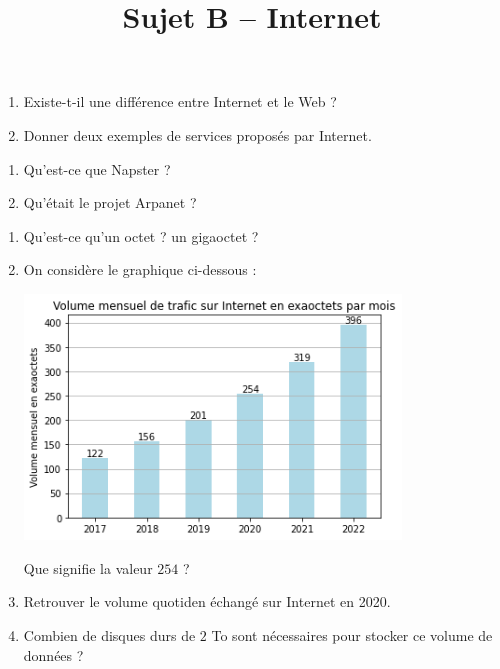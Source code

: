 \documentclass[a4paper]{article}
\begin{document}
\title{Sujet B -- Internet}

\pagestyle{empty}

\date{}
\author{}

\maketitle{}
\thispagestyle{empty}

\exo[2 points]\vspace*{-2mm}
\begin{enumerate}
  \item Existe-t-il une différence entre Internet et le Web ?
  \item Donner deux exemples de services proposés par Internet.
\end{enumerate}

\bigskip

\exo[3 points]\vspace*{-2mm}
\begin{enumerate}
  \item Qu'est-ce que Napster ?
  \item Qu'était le projet Arpanet ?
\end{enumerate}

\bigskip

\exo[6 points]\vspace*{-2mm}
\begin{enumerate}
  \item Qu'est-ce qu'un octet ? un gigaoctet ?
  \item On considère le graphique ci-dessous : 
   \begin{center}
     \includegraphics[width=10cm]{volume.png}
   \end{center} 
   Que signifie la valeur $254$ ?
  \item Retrouver le volume quotiden échangé sur Internet en 2020.
  \item Combien de disques durs de $2$ To sont nécessaires pour stocker ce volume de données ?
\end{enumerate}
\end{document}
